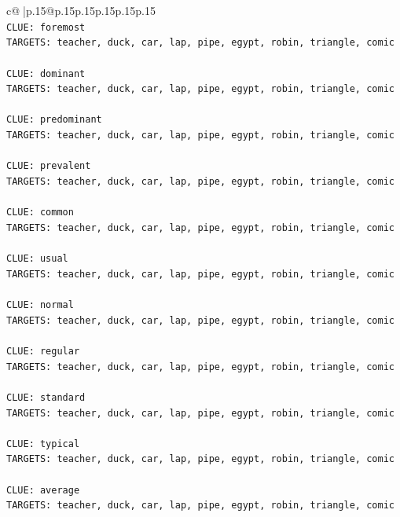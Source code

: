 \documentclass{article}
\begin{document}
{\begin{supertabular}{c@{$\;$}|p{.15\linewidth}@{}p{.15\linewidth}p{.15\linewidth}p{.15\linewidth}p{.15\linewidth}p{.15\linewidth}}
{{{\\ 
\texttt{CLUE: foremost} \\
\texttt{TARGETS: teacher, duck, car, lap, pipe, egypt, robin, triangle, comic} \\
\\ 
\texttt{CLUE: dominant} \\
\texttt{TARGETS: teacher, duck, car, lap, pipe, egypt, robin, triangle, comic} \\
\\ 
\texttt{CLUE: predominant} \\
\texttt{TARGETS: teacher, duck, car, lap, pipe, egypt, robin, triangle, comic} \\
\\ 
\texttt{CLUE: prevalent} \\
\texttt{TARGETS: teacher, duck, car, lap, pipe, egypt, robin, triangle, comic} \\
\\ 
\texttt{CLUE: common} \\
\texttt{TARGETS: teacher, duck, car, lap, pipe, egypt, robin, triangle, comic} \\
\\ 
\texttt{CLUE: usual} \\
\texttt{TARGETS: teacher, duck, car, lap, pipe, egypt, robin, triangle, comic} \\
\\ 
\texttt{CLUE: normal} \\
\texttt{TARGETS: teacher, duck, car, lap, pipe, egypt, robin, triangle, comic} \\
\\ 
\texttt{CLUE: regular} \\
\texttt{TARGETS: teacher, duck, car, lap, pipe, egypt, robin, triangle, comic} \\
\\ 
\texttt{CLUE: standard} \\
\texttt{TARGETS: teacher, duck, car, lap, pipe, egypt, robin, triangle, comic} \\
\\ 
\texttt{CLUE: typical} \\
\texttt{TARGETS: teacher, duck, car, lap, pipe, egypt, robin, triangle, comic} \\
\\ 
\texttt{CLUE: average} \\
\texttt{TARGETS: teacher, duck, car, lap, pipe, egypt, robin, triangle, comic} \\
\\ 
}}}
\end{supertabular}}
\end{document}
